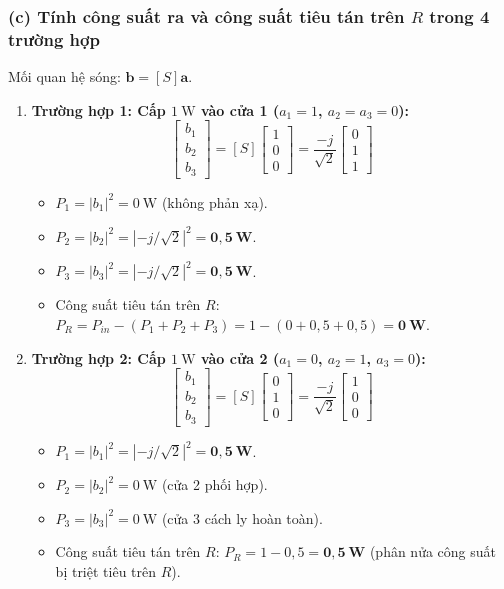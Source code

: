 \documentclass[12pt,a4paper]{article}
\begin{document}
\subsubsection{(c) Tính công suất ra và công suất tiêu tán trên $R$ trong 4 trường hợp}
Mối quan hệ sóng: $\mathbf{b} = [S]\mathbf{a}$.
\begin{enumerate}
    \item \textbf{Trường hợp 1: Cấp $1~\text{W}$ vào cửa 1 ($a_1 = 1$, $a_2 = a_3 = 0$):}
    \[
    \begin{bmatrix} b_1 \\ b_2 \\ b_3 \end{bmatrix} = [S] \begin{bmatrix} 1 \\ 0 \\ 0 \end{bmatrix} = \frac{-j}{\sqrt{2}} \begin{bmatrix} 0 \\ 1 \\ 1 \end{bmatrix}
    \]
    \begin{itemize}
        \item $P_1 = |b_1|^2 = 0~\text{W}$ (không phản xạ).
        \item $P_2 = |b_2|^2 = |-j/\sqrt{2}|^2 = \mathbf{0{,}5~\text{W}}$.
        \item $P_3 = |b_3|^2 = |-j/\sqrt{2}|^2 = \mathbf{0{,}5~\text{W}}$.
        \item Công suất tiêu tán trên $R$: $P_R = P_{in} - (P_1 + P_2 + P_3) = 1 - (0 + 0{,}5 + 0{,}5) = \mathbf{0~\text{W}}$.
    \end{itemize}

    \item \textbf{Trường hợp 2: Cấp $1~\text{W}$ vào cửa 2 ($a_1 = 0$, $a_2 = 1$, $a_3 = 0$):}
    \[
    \begin{bmatrix} b_1 \\ b_2 \\ b_3 \end{bmatrix} = [S] \begin{bmatrix} 0 \\ 1 \\ 0 \end{bmatrix} = \frac{-j}{\sqrt{2}} \begin{bmatrix} 1 \\ 0 \\ 0 \end{bmatrix}
    \]
    \begin{itemize}
        \item $P_1 = |b_1|^2 = |-j/\sqrt{2}|^2 = \mathbf{0{,}5~\text{W}}$.
        \item $P_2 = |b_2|^2 = 0~\text{W}$ (cửa 2 phối hợp).
        \item $P_3 = |b_3|^2 = 0~\text{W}$ (cửa 3 cách ly hoàn toàn).
        \item Công suất tiêu tán trên $R$: $P_R = 1 - 0{,}5 = \mathbf{0{,}5~\text{W}}$ (phân nửa công suất bị triệt tiêu trên $R$).
    \end{itemize}


\end{enumerate}
\end{document}
